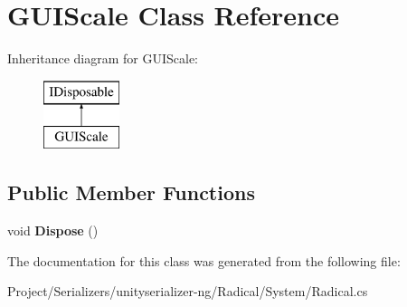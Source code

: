 \hypertarget{class_g_u_i_scale}{}\section{G\+U\+I\+Scale Class Reference}
\label{class_g_u_i_scale}
Inheritance diagram for G\+U\+I\+Scale\+:\begin{figure}[H]
\begin{center}
\leavevmode
\includegraphics[height=2.000000cm]{class_g_u_i_scale}
\end{center}
\end{figure}
\subsection*{Public Member Functions}
\begin{DoxyCompactItemize}
\item 
\mbox{\label{class_g_u_i_scale_aa00049ce6abb6b97382a00260f32952d}} 
void {\bfseries Dispose} ()
\end{DoxyCompactItemize}


The documentation for this class was generated from the following file\+:\begin{DoxyCompactItemize}
\item 
Project/\+Serializers/unityserializer-\/ng/\+Radical/\+System/Radical.\+cs\end{DoxyCompactItemize}
